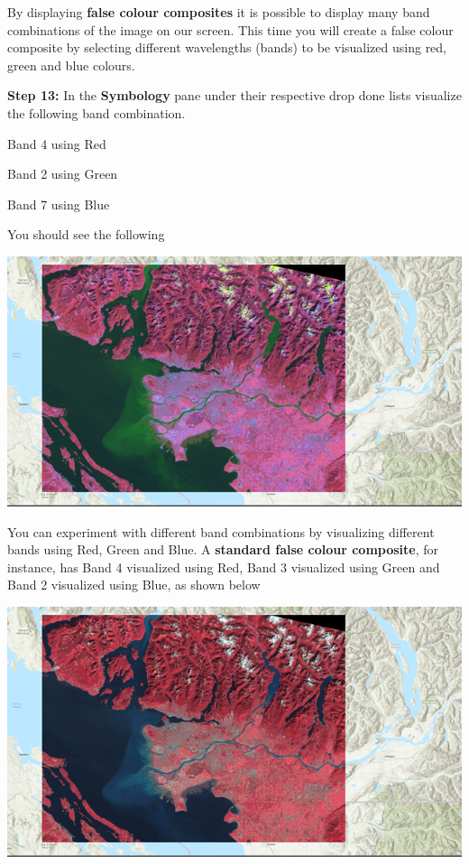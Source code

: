 \documentclass[
]{book}
\begin{document}
By displaying \textbf{false colour composites} it is possible to display many band combinations of the image on our screen. This time you will create a false colour composite by selecting different wavelengths (bands) to be visualized using red, green and blue colours.

\textbf{Step 13:} In the \textbf{Symbology} pane under their respective drop done lists visualize the following band combination.

Band 4 using Red

Band 2 using Green

Band 7 using Blue

You should see the following

\begin{center}\includegraphics[width=1\linewidth]{images/01-false-colour-composite-pink} \end{center}

You can experiment with different band combinations by visualizing different bands using Red, Green and Blue. A \textbf{standard false colour composite}, for instance, has Band 4 visualized using Red, Band 3 visualized using Green and Band 2 visualized using Blue, as shown below

\begin{center}\includegraphics[width=1\linewidth]{images/01-standard-false-colour-composite} \end{center}
\end{document}
